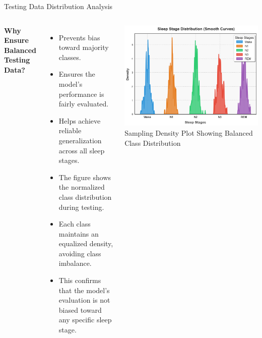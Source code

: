 \begin{frame}{Testing Data Distribution Analysis}

    \begin{columns}

        \textbf{Why Ensure Balanced Testing Data?}
        \begin{itemize}
     \item Prevents bias toward majority classes.
        \item Ensures the model's performance is fairly evaluated.
        \item Helps achieve reliable generalization across all sleep stages.
           \item The figure shows the normalized class distribution during testing.
        \item Each class maintains an equalized density, avoiding class imbalance.
        \item This confirms that the model's evaluation is not biased toward any specific sleep stage.
        \end{itemize}

        \centering
        \includegraphics[width=0.9\linewidth]{figures/sample distribution plot pdf.png} %
        \vspace{5pt}
        {\textcolor{uwopurple}{\small Sampling Density Plot Showing Balanced Class Distribution}}

    \end{columns}

\end{frame}



